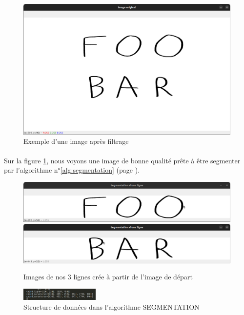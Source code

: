 \documentclass[a4paper]{article}
\begin{document}
			\begin{figure}
				\includegraphics[width=\textwidth]{segmentation_image_originel.png}
				\centering
				\caption{Exemple d'une image après filtrage}
				\label{fig:imageOriginel}
			\end{figure}
			\paragraph{} Sur la figure \ref{fig:imageOriginel}, nous voyons une image de bonne qualité prête à être segmenter par l'algorithme n°\ref{alg:segmentation} (page \pageref{alg:segmentation}). 
			\begin{figure}
				\includegraphics[width=.8\textwidth]{segmentation_ligne1.png}
				\centering
				\includegraphics[width=.8\textwidth]{segmentation_ligne2.png}
				\centering
				\caption{Images de nos 3 lignes crée à partir de l'image de départ}
				\label{fig:imageLignes}
			\end{figure}
			\begin{figure}
					\includegraphics[width=0.35\textwidth]{structDonnee.png}
					\caption{Structure de données dans l'algorithme SEGMENTATION}
					\label{fig:structDonnee}
			\end{figure}
\end{document}
